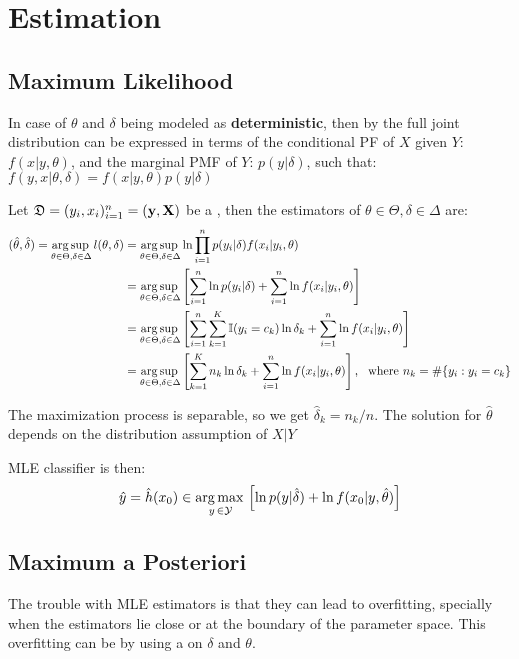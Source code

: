 \section{Estimation}

\subsection{Maximum Likelihood}
In case of $\theta$ and $\delta$ being modeled as \textbf{deterministic}, then by  the full joint distribution can be expressed in terms of the conditional PF of $X$ given $Y$: $f(x|y,\theta)$, and the marginal PMF of $Y$: $p(y|\delta)$, such that: 
$f(y,x|\theta,\delta) = f(x|y,\theta)p(y|\delta)$

Let $\mathfrak{D}=(y_i,x_i)_{i=1}^n=(\vb{y},\vb{X})$ be a , then the  estimators of $\theta\in\Theta, \delta\in\Delta$ are:
\begin{align*}
    (\hat{\theta},\hat{\delta}) = \operatorname*{arg\,sup\,}_{\theta\in\Theta, \delta\in\Delta}l(\theta,\delta) &= \operatorname*{arg\,sup\,}_{\theta\in\Theta, \delta\in\Delta} \ln\prod_{i=1}^n p(y_i|\delta)f(x_i|y_i,\theta) \\
    &= \operatorname*{arg\,sup\,}_{\theta\in\Theta, \delta\in\Delta} \left[\sum_{i=1}^n\ln p(y_i|\delta)+\sum_{i=1}^n\ln f(x_i|y_i,\theta)\right] \\
    &= \operatorname*{arg\,sup\,}_{\theta\in\Theta, \delta\in\Delta} \left[\sum_{i=1}^n\sum_{k=1}^K \operatorname{\mathbb{I}}(y_i=c_k)\ln\delta_k+\sum_{i=1}^n\ln f(x_{i}|y_i,\theta)\right]\\
    &= \operatorname*{arg\,sup\,}_{\theta\in\Theta, \delta\in\Delta} \left[\sum_{k=1}^K n_k\ln\delta_k+\sum_{i=1}^n\ln f(x_{i}|y_i,\theta)\right],\ \text{ where } n_k=\#\{y_i : y_i=c_k\}
\end{align*}

The maximization process is separable, so we get $\hat{\delta}_{k}=n_k/n$. The solution for $\hat{\theta}$ depends on the distribution assumption of $X|Y$

MLE classifier is then:
\begin{equation*}
    \hat{y}=\hat{h}(x_0) \in \operatorname*{arg\,max\,}_{y\,\in\mathcal{Y}}\left[ \ln p(y|\hat{\delta})+\ln f(x_0|y,\hat{\theta})\right]
\end{equation*}

\subsection{Maximum a Posteriori}
The trouble with MLE estimators is that they can lead to overfitting, specially when the estimators lie close or at the boundary of the parameter space. This overfitting can be  by using a  on $\delta$ and $\theta$. 

